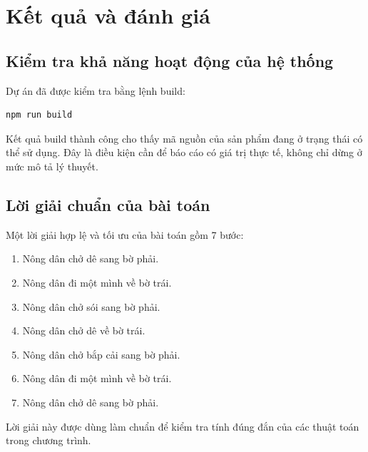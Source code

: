 \documentclass[a4paper,12pt]{article}
\begin{document}
\section{Kết quả và đánh giá}

\subsection{Kiểm tra khả năng hoạt động của hệ thống}

Dự án đã được kiểm tra bằng lệnh build:

\begin{lstlisting}[caption={Lệnh build dự án web}]
npm run build
\end{lstlisting}

Kết quả build thành công cho thấy mã nguồn của sản phẩm đang ở trạng thái có thể sử dụng. Đây là điều kiện cần để báo cáo có giá trị thực tế, không chỉ dừng ở mức mô tả lý thuyết.

\subsection{Lời giải chuẩn của bài toán}

Một lời giải hợp lệ và tối ưu của bài toán gồm 7 bước:
\begin{enumerate}
    \item Nông dân chở dê sang bờ phải.
    \item Nông dân đi một mình về bờ trái.
    \item Nông dân chở sói sang bờ phải.
    \item Nông dân chở dê về bờ trái.
    \item Nông dân chở bắp cải sang bờ phải.
    \item Nông dân đi một mình về bờ trái.
    \item Nông dân chở dê sang bờ phải.
\end{enumerate}

Lời giải này được dùng làm chuẩn để kiểm tra tính đúng đắn của các thuật toán trong chương trình.
\end{document}
